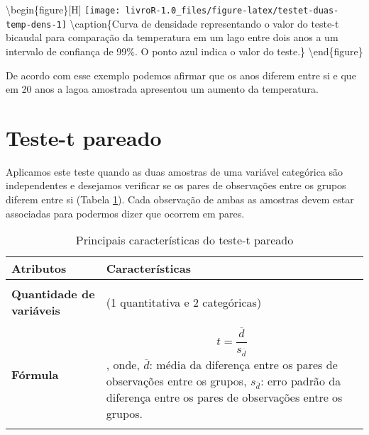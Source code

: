 \documentclass[14pt,titlepage, oneside, openany, a4paper]{book}
\begin{document}
\textbackslash{}begin\{figure\}{[}H{]}
\texttt{[image: livroR-1.0\_files/figure-latex/testet-duas-temp-dens-1]} \textbackslash{}caption\{Curva de densidade representando o valor do teste-t bicaudal para comparação da temperatura em um lago entre dois anos a um intervalo de confiança de 99\%. O ponto azul indica o valor do teste.\}\label{fig:testet-duas-temp-dens}
\textbackslash{}end\{figure\}

De acordo com esse exemplo podemos afirmar que os anos diferem entre si e que em 20 anos a lagoa amostrada apresentou um aumento da temperatura.

\hypertarget{teste-t-pareado}{%
\section{Teste-t pareado}\label{teste-t-pareado}}

Aplicamos este teste quando as duas amostras de uma variável categórica são independentes e desejamos verificar se os pares de observações entre os grupos diferem entre si (Tabela \ref{tab:tab3t}). Cada observação de ambas as amostras devem estar associadas para podermos dizer que ocorrem em pares.

\begin{table}

\caption{\label{tab:tab3t}Principais características do teste-t pareado}
\centering
\begin{tabular}[c]{>{\raggedright\arraybackslash}p{10em}>{\raggedright\arraybackslash}p{30em}}
\toprule
Atributos & Características\\
\midrule
\textbf{\cellcolor{gray!6}{Tipo de variável}} & \cellcolor{gray!6}{Quantitativa e categórica}\\
\textbf{Quantidade de variáveis} & 3 (1 quantitativa e 2 categóricas)\\
\textbf{\cellcolor{gray!6}{Hipótese nula}} & \cellcolor{gray!6}{A diferença na média da variável quantitativa entre os pares de grupos é igual a 0.}\\
\textbf{Fórmula} & $$t=\frac{\overline{d}}{s_{\overline{d}}}$$, onde, $\overline{d}$: média da diferença entre os pares de observações entre os grupos, $s_{\overline{d}}$: erro padrão da diferença entre os pares de observações entre os grupos.\\
\textbf{\cellcolor{gray!6}{Observação}} & \cellcolor{gray!6}{Não há a necessidade de post-hoc nem expressa-la graficamente.}\\
\bottomrule
\end{tabular}
\end{table}
\end{document}
